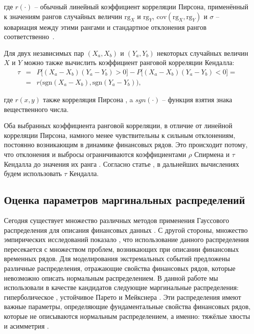 \noindent где $r(\cdot)$ -- обычный линейный коэффициент корреляции Пирсона, применённый к значениям  рангов случайных величин $\text{rg}_X$ и $\text{rg}_Y$,  $\text{cov} (\text{rg}_{X}, \text{rg}_{Y})$ и $\sigma$ -- ковариация между этими рангами и стандартное отклонения рангов соответственно~\cite{Mye2003}.

Для двух независимых пар $(X_a, X_b)$ и $(Y_a, Y_b)$ некоторых случайных величин $X$ и $Y$ можно также вычислить %
коэффициент ранговой корреляции Кендалла:
%
\begin{eqnarray}\label{kendall}
\tau &=& P\big[(X_a-X_b)(Y_a-Y_b)>0\big]-P\big[(X_a-X_b)(Y_a-Y_b)<0\big] = \\ 
&=& r\big(\text{sgn}(X_a-X_b),\text{sgn}(Y_a-Y_b)\big),\nonumber
\end{eqnarray}

\noindent где $r(x,y)$ также корреляция Пирсона \cite{Kendall1970}, a $sgn(\cdot)$ -- функция взятия знака вещественного числа.

Оба выбранных коэффициента ранговой корреляции, в отличие от линейной корреляции Пирсона, намного менее чувствительны к сильным отклонениям, постоянно возникающим в динамике финансовых рядов.
Это происходит потому, что отклонения и выбросы ограничиваются коэффициентами $\rho$ Спирмена и $\tau$ Кендалла до значения их ранга \cite{Ane2003}.
Согласно статье \cite{Dissmann2013}, в дальнейших вычислениях будем использовать $\tau$ Кендалла.

\subsection{Оценка параметров маргинальных распределений}
\label{methodology:marginals}

Сегодня существует множество различных методов применения Гауссового распределения для описания финансовых данных \cite{Json1949}. 
С другой стороны, множество эмпирических исследований показало \cite{Limp2011, Rachev2005, Wilmott2007}, что использование данного распределения пересекается с множеством проблем, возникающих при описании финансовых временных рядов. 
Для моделирования экстремальных событий предложены различные распределения, отражающие свойства финансовых рядов, которые невозможно описать нормальным распределением.
В данной работе мы использовали в качестве кандидатов следующие маргинальные распределения: гиперболическое \cite{Barndoff1983}, устойчивое Парето \cite{Nolan2009, Rachev2005, Stoyanov2013} и Мейкснера \cite{Schoutens2002}. Эти распределения имеют важные параметры, определяющие фундаментальные свойства финансовых рядов, которые не описываются нормальным распределением, а именно: тяжёлые хвосты и асимметрия \cite{Stoyanov2013}. 

